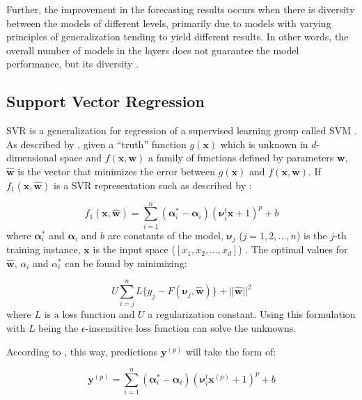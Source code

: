 Further, the improvement in the forecasting results occurs when there is diversity between the models of different levels, primarily due to models with varying principles of generalization tending to yield different results. In other words, the overall number of models in the layers does not guarantee the model performance, but its diversity \cite{ribeiro2020Ensemble}.

\subsection{Support Vector Regression}
\ac{SVR} is a generalization for regression of a supervised learning group called \ac{SVM} \cite{awad2015Support}. As described by , given a ``truth'' function $g(\boldsymbol{x})$ which is unknown in $d$-dimensional space and $f(\boldsymbol{x}, \boldsymbol{w})$ a family of functions defined by parameters $\boldsymbol{w}$, $\boldsymbol{\hat{w}}$ is the vector that minimizes the error between $g(\boldsymbol{x})$ and $f(\boldsymbol{x}, \boldsymbol{w})$. If $f_1(\boldsymbol{x}, \boldsymbol{\hat{w}})$ is a \ac{SVR} representation such as described by :

\begin{equation}
    f_1(\boldsymbol{x}, \boldsymbol{\hat{w}}) =
    \sum_{i=1}^n (\boldsymbol{\alpha}_i^* - \boldsymbol{\alpha}_i)
    (\boldsymbol{\nu}_i^t \boldsymbol{x} + 1)^p +b
\end{equation}
where $\boldsymbol{\alpha}_i^*$ and $\boldsymbol{\alpha}_i$ and $b$ are constants of the model, $\boldsymbol{\nu}_j$ ($j = 1, 2, ..., n$) is the $j$-th training instance, $\boldsymbol{x}$ is the input space ($[x_1, x_2, ..., x_d]$) . The optimal values for $\boldsymbol{\hat{w}}$, $\alpha_i$ and $\alpha_i^*$ can be found by minimizing:

\begin{equation}
    U \sum_{i=j}^n L\{ y_j - F(\boldsymbol{\nu}_j, \boldsymbol{\hat{w}}) \} + || \boldsymbol{\hat{w}} ||^2
\end{equation}
where $L$ is a loss function and $U$ a regularization constant. Using this formulation with $L$ being the $\epsilon$-insensitive loss function \cite{cortes1995Supportvector} can solve the unknowns.

According to , this way, predictions $\boldsymbol{y}^{(p)}$ will take the form of:

\begin{equation}
    \boldsymbol{y}^{(p)} = 
    \sum_{i=1}^n (\boldsymbol{\alpha}_i^* - \boldsymbol{\alpha}_i)
    (\boldsymbol{\nu}_i^t \boldsymbol{x}^{(p)} + 1)^p +b
\end{equation}

